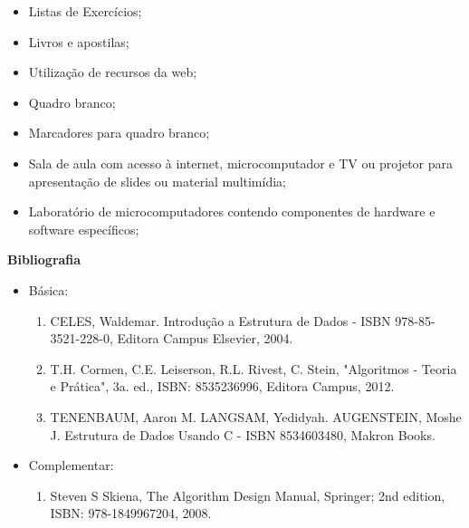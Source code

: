 \begin{itemize} 
  \item Listas de Exercícios;
  \item Livros e apostilas;
  \item Utilização de recursos da web;
  \item Quadro branco;
  \item Marcadores para quadro branco;
  \item Sala de aula com acesso à internet, microcomputador e TV ou projetor para apresentação de slides ou material multimídia;
  \item Laboratório de microcomputadores contendo componentes de hardware e software específicos;
\end{itemize}


\begin{snugshade}\begin{center}\textbf{
    Bibliografia
}\end{center}\end{snugshade}

\begin{itemize} 
  \item Básica:
	\begin{enumerate}
	\item CELES, Waldemar. Introdução a Estrutura de Dados -  ISBN 978-85-3521-228-0, Editora Campus Elsevier, 2004.
	\item T.H. Cormen, C.E. Leiserson, R.L. Rivest, C. Stein, "Algoritmos - Teoria e Prática", 3a. ed., ISBN: 8535236996, Editora Campus, 2012.
	\item TENENBAUM, Aaron M. LANGSAM, Yedidyah. AUGENSTEIN, Moshe J. Estrutura de Dados Usando C - ISBN 8534603480, Makron Books. 
	
	\end{enumerate}
  \item Complementar:
	\begin{enumerate} 
	\item Steven S Skiena, The Algorithm Design Manual, Springer; 2nd edition, ISBN: 978-1849967204, 2008.\\
	\end{enumerate}
\end{itemize}

